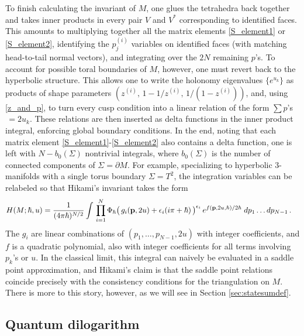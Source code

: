 \documentclass[hyper]{JHEP3}
\begin{document}
To finish calculating the invariant of $M$, one glues the tetrahedra back together and 
takes inner products in every pair $V$ and $V^*$ corresponding to identified faces.
This amounts to multiplying together all the matrix elements \eqref{S_element1} or \eqref{S_element2},
identifying the $p^{(i)}_j$ variables on identified faces (with matching head-to-tail normal vectors),
and integrating over the $2N$ remaining $p$'s.
To account for possible toral boundaries of $M$, however,
one must revert back to the hyperbolic structure. This allows one to write the holonomy eigenvalues $\{ e^{u_k} \}$ as products of shape parameters $(z^{(i)},\,1-1/z^{(i)},\,1/(1-z^{(i)}))$,
and, using \eqref{z_and_p}, to turn every cusp condition
into a linear relation of the form $\sum p$'s$\, = 2u_k$.
These relations are then inserted as delta functions in the inner product integral,
enforcing global boundary conditions.
In the end, noting that each matrix element \eqref{S_element1}-\eqref{S_element2}
also contains a delta function, one is left with $N-b_0(\Sigma)$ nontrivial integrals,
where $b_0 (\Sigma)$ is the number of connected components of $\Sigma = \partial M$.
For example, specializing to hyperbolic 3-manifolds with a single torus boundary $\Sigma = T^2$, the integration variables can be relabeled so that Hikami's invariant takes the form
\begin{align}
H (M; \hbar, u)
& = \frac{1}{(4\pi\hbar)^{N/2}} \int\,
\prod_{i=1}^{N} \Phi_{\hbar} \big( \, g_i ({\bf p}, 2u) +\epsilon_i (i \pi + \hbar) \,\big)^{\epsilon_i}
\,e^{f({\bf p}, 2u, \hbar)/2\hbar}\; dp_1 \ldots dp_{N-1}\,.
\label{gen_Hik_integral}
\end{align}
The $g_i$ are linear combinations of $(p_1, \ldots, p_{N-1},2u)$ with integer coefficients,
and $f$ is a quadratic polynomial, also with integer coefficients for all terms involving $p_k$'s or $u$. In the classical limit, this integral can naively be evaluated in a saddle point approximation, and Hikami's claim is that the saddle point relations coincide precisely with the consistency conditions for the triangulation on $M$. There is more to this story, however, as we will see in Section \ref{sec:statesumdef}.



\subsection{Quantum dilogarithm}
\label{sec:qdilog}
\end{document}
